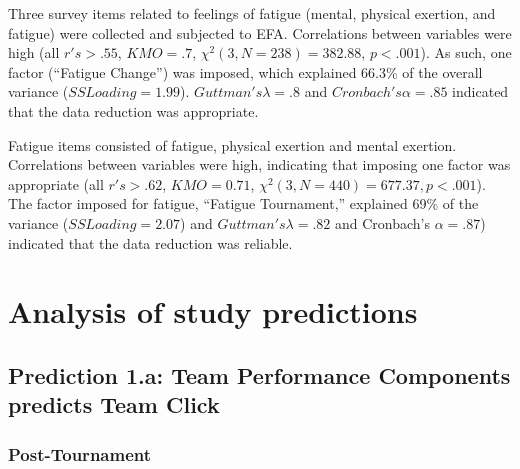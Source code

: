 \begin{CJK}{UTF8}{gbsn}
Three survey items related to feelings of fatigue (mental, physical exertion, and fatigue)  were collected and subjected to EFA.
Correlations between variables were high (all $r's > .55$, $KMO = .7$, $\chi^2(3, N = 238) = 382.88$, $p < .001$).  As such, one factor (``Fatigue Change'') was imposed, which explained 66.3\% of the overall variance ($SS Loading = 1.99$).  $Guttman's \lambda =.8$ and $Cronbach's \alpha = .85$ indicated that the data reduction was appropriate.

Fatigue items consisted of fatigue, physical exertion and mental exertion. Correlations between variables were high, indicating that imposing one factor was appropriate (all $r's > .62$, $KMO = 0.71$, $\chi^2(3, N = 440) =  677.37, p < .001$).  The factor imposed for fatigue, ``Fatigue Tournament,'' explained 69\% of the variance ($SS Loading = 2.07$) and $Guttman's \lambda =.82$ and Cronbach's $\alpha = .87$) indicated that the data reduction was reliable.






























 \section{Analysis of study predictions\label{app8:analysisPredictions}}



 \subsection{Prediction 1.a: Team Performance Components predicts Team Click\label{app8:prediction1a}}



 \subsubsection{Post-Tournament\label{app8:prediction1aPost}}


\end{CJK}
